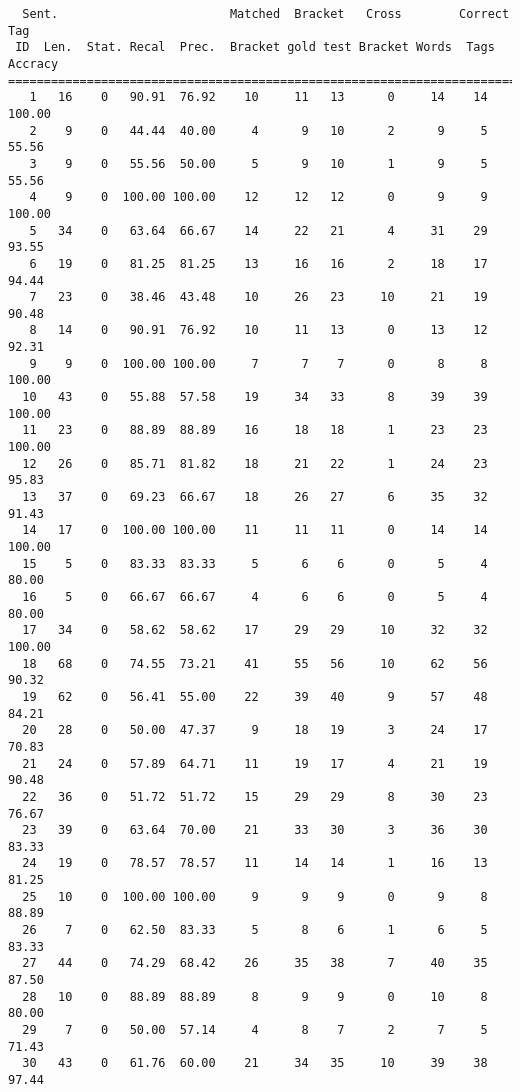 \scriptsize
\begin{verbatim}
  Sent.                        Matched  Bracket   Cross        Correct Tag
 ID  Len.  Stat. Recal  Prec.  Bracket gold test Bracket Words  Tags Accracy
============================================================================
   1   16    0   90.91  76.92    10     11   13      0     14    14   100.00
   2    9    0   44.44  40.00     4      9   10      2      9     5    55.56
   3    9    0   55.56  50.00     5      9   10      1      9     5    55.56
   4    9    0  100.00 100.00    12     12   12      0      9     9   100.00
   5   34    0   63.64  66.67    14     22   21      4     31    29    93.55
   6   19    0   81.25  81.25    13     16   16      2     18    17    94.44
   7   23    0   38.46  43.48    10     26   23     10     21    19    90.48
   8   14    0   90.91  76.92    10     11   13      0     13    12    92.31
   9    9    0  100.00 100.00     7      7    7      0      8     8   100.00
  10   43    0   55.88  57.58    19     34   33      8     39    39   100.00
  11   23    0   88.89  88.89    16     18   18      1     23    23   100.00
  12   26    0   85.71  81.82    18     21   22      1     24    23    95.83
  13   37    0   69.23  66.67    18     26   27      6     35    32    91.43
  14   17    0  100.00 100.00    11     11   11      0     14    14   100.00
  15    5    0   83.33  83.33     5      6    6      0      5     4    80.00
  16    5    0   66.67  66.67     4      6    6      0      5     4    80.00
  17   34    0   58.62  58.62    17     29   29     10     32    32   100.00
  18   68    0   74.55  73.21    41     55   56     10     62    56    90.32
  19   62    0   56.41  55.00    22     39   40      9     57    48    84.21
  20   28    0   50.00  47.37     9     18   19      3     24    17    70.83
  21   24    0   57.89  64.71    11     19   17      4     21    19    90.48
  22   36    0   51.72  51.72    15     29   29      8     30    23    76.67
  23   39    0   63.64  70.00    21     33   30      3     36    30    83.33
  24   19    0   78.57  78.57    11     14   14      1     16    13    81.25
  25   10    0  100.00 100.00     9      9    9      0      9     8    88.89
  26    7    0   62.50  83.33     5      8    6      1      6     5    83.33
  27   44    0   74.29  68.42    26     35   38      7     40    35    87.50
  28   10    0   88.89  88.89     8      9    9      0     10     8    80.00
  29    7    0   50.00  57.14     4      8    7      2      7     5    71.43
  30   43    0   61.76  60.00    21     34   35     10     39    38    97.44

\end{verbatim}

